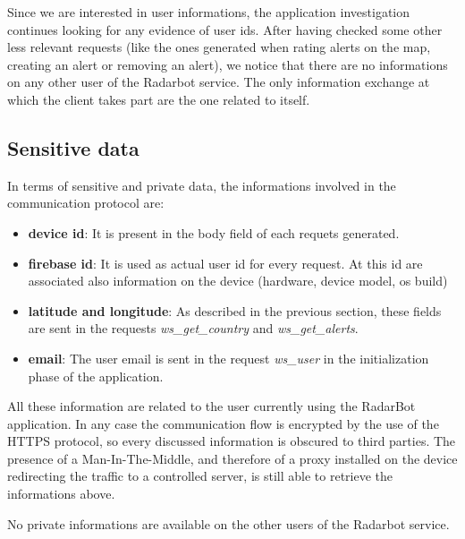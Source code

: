 			\par Since we are interested in user informations, the application investigation continues looking for any evidence of user ids. After having checked some other less relevant requests (like the ones generated when rating alerts on the map, creating an alert or removing an alert), we notice that there are no informations on any other user of the Radarbot service. The only information exchange at which the client takes part are the one related to itself.
		
	\subsection{Sensitive data}
		\par In terms of sensitive and private data, the informations involved in the communication protocol are:
		\begin{itemize}
			\item \textbf{device id}: It is present in the body field of each requets generated.
			\item \textbf{firebase id}: It is used as actual user id for every request. At this id are associated also information on the device (hardware, device model, os build)
			\item \textbf{latitude and longitude}: As described in the previous section, these fields are sent in the requests \textit{ws\_get\_country} and \textit{ws\_get\_alerts}.
			\item \textbf{email}: The user email is sent in the request \textit{ws\_user} in the initialization phase of the application.
		\end{itemize}
		\par All these information are related to the user currently using the RadarBot application. In any case the communication flow is encrypted by the use of the HTTPS protocol, so every discussed information is obscured to third parties. The presence of a Man-In-The-Middle, and therefore of a proxy installed on the device redirecting the traffic to a controlled server, is still able to retrieve the informations above.\newline
		\par No private informations are available on the other users of the Radarbot service.
		
